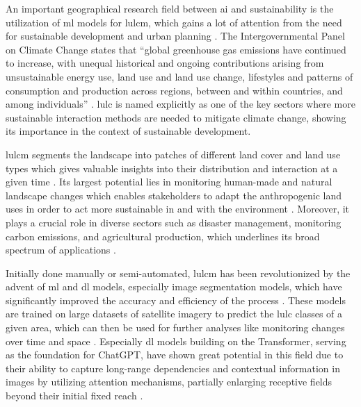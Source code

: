 An important geographical research field between \gls{ai} and sustainability is the utilization of \gls{ml} models for \gls{lulcm}, which gains a lot of attention from the need for sustainable development and urban planning \autocite{Zhao.Tu.ea2023}. The Intergovernmental Panel on Climate Change states that \enquote{global greenhouse gas emissions have continued to increase, with unequal historical and ongoing contributions arising from unsustainable energy use, land use and land use change, lifestyles and patterns of consumption and production across regions, between and within countries, and among individuals} \autocite[4]{IPCC2023}. \gls{lulc} is named explicitly as one of the key sectors where more sustainable interaction methods are needed to mitigate climate change, showing its importance in the context of sustainable development.

\gls{lulcm} segments the landscape into patches of different land cover and land use types which gives valuable insights into their distribution and interaction at a given time \autocite{Li.Cai.ea2024}. Its largest potential lies in monitoring human-made and natural landscape changes which enables stakeholders to adapt the anthropogenic land uses in order to act more sustainable in and with the environment \autocite{Moharram.Sundaram2023}. Moreover, it plays a crucial role in diverse sectors such as disaster management, monitoring carbon emissions, and agricultural production, which underlines its broad spectrum of applications \autocite{Alhassan.Henry.ea2020,Rangel.Terven.ea2024,Zhao.Tu.ea2023}.

Initially done manually or semi-automated, \gls{lulcm} has been revolutionized by the advent of \gls{ml} and \gls{dl} models, especially image segmentation models, which have significantly improved the accuracy and efficiency of the process \autocite{Zhao.Tu.ea2023}. These models are trained on large datasets of satellite imagery to predict the \gls{lulc} classes of a given area, which can then be used for further analyses like monitoring changes over time and space \autocite{Li.Cai.ea2024}. Especially \gls{dl} models building on the Transformer, serving as the foundation for ChatGPT, have shown great potential in this field due to their ability to capture long-range dependencies and contextual information in images by utilizing attention mechanisms, partially enlarging receptive fields beyond their initial fixed reach \autocite{Alhichri.Alswayed.ea2021,Chen.Yang.ea2016,Xie.Wang.ea2021,Zheng.Lu.ea2021}.

